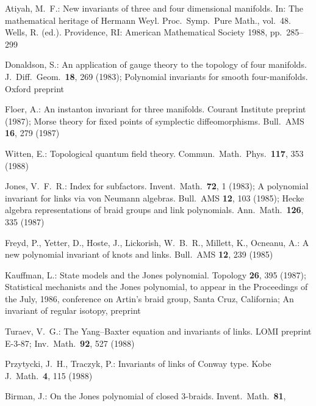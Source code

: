 \documentclass[11pt,a4paper]{article}
\begin{document}
\begingroup
\small
\setlength{\parindent}{0pt}
\setlength{\itemsep}{2pt}
\begin{enumerate}[label={[\arabic*]}, leftmargin=2.4em, labelsep=0.5em, align=left]
    \item Atiyah, M.~F.: New invariants of three and four dimensional manifolds.
          In: The mathematical heritage of Hermann Weyl. Proc.\ Symp.\ Pure Math., vol.~48.
          Wells, R. (ed.). Providence, RI: American Mathematical Society 1988, pp.~285--299
    \item Donaldson, S.: An application of gauge theory to the topology of four manifolds.
          J.\ Diff.\ Geom.\ \textbf{18}, 269 (1983); Polynomial invariants for smooth
          four-manifolds. Oxford preprint
    \item Floer, A.: An instanton invariant for three manifolds. Courant Institute preprint (1987);
          Morse theory for fixed points of symplectic diffeomorphisms. Bull.\ AMS \textbf{16},
          279 (1987)
    \item Witten, E.: Topological quantum field theory. Commun.\ Math.\ Phys.\ \textbf{117},
          353 (1988)
    \item Jones, V.~F.~R.: Index for subfactors. Invent.\ Math.\ \textbf{72}, 1 (1983);
          A polynomial invariant for links via von Neumann algebras. Bull.\ AMS \textbf{12},
          103 (1985); Hecke algebra representations of braid groups and link polynomials.
          Ann.\ Math.\ \textbf{126}, 335 (1987)
    \item Freyd, P., Yetter, D., Hoste, J., Lickorish, W.~B.~R., Millett, K., Ocneanu, A.:
          A new polynomial invariant of knots and links. Bull.\ AMS \textbf{12}, 239 (1985)
    \item Kauffman, L.: State models and the Jones polynomial. Topology \textbf{26}, 395 (1987);
          Statistical mechanists and the Jones polynomial, to appear in the Proceedings of the
          July, 1986, conference on Artin's braid group, Santa Cruz, California;
          An invariant of regular isotopy, preprint
    \item Turaev, V.~G.: The Yang--Baxter equation and invariants of links.
          LOMI preprint E-3-87; Inv.\ Math.\ \textbf{92}, 527 (1988)
    \item Przytycki, J.~H., Traczyk, P.: Invariants of links of Conway type.
          Kobe J.\ Math.\ \textbf{4}, 115 (1988)
    \item Birman, J.: On the Jones polynomial of closed 3-braids. Invent.\ Math.\ \textbf{81},

\end{enumerate}
\end{document}
